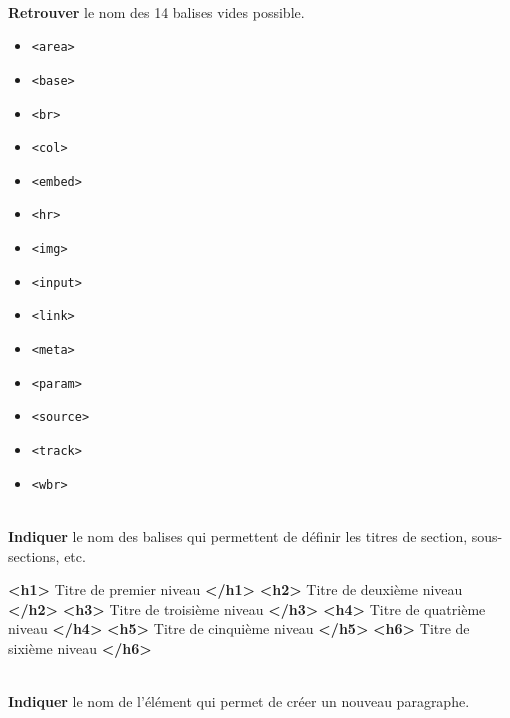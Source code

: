 \documentclass[a4paper,12pt]{article}
\newenvironment{eleve}%
{\begin{activite}\color{noiramu}\\}
{\end{activite}}
\providecommand{\tightlist}{%
      \setlength{\itemsep}{0pt}\setlength{\parskip}{0pt}}
\newenvironment{Shaded}{}{}
\newcommand{\KeywordTok}[1]{\textcolor[rgb]{0.00,0.44,0.13}{\textbf{{#1}}}}
\newcommand{\NormalTok}[1]{{#1}}
\begin{document}
\begin{eleve}
    \textbf{Retrouver} le nom des 14 balises vides possible.
        
        \end{eleve}\begin{methode}
    \begin{itemize}
\tightlist
\item
  \texttt{\textless{}area\textgreater{}}
\item
  \texttt{\textless{}base\textgreater{}}
\item
  \texttt{\textless{}br\textgreater{}}
\item
  \texttt{\textless{}col\textgreater{}}
\item
  \texttt{\textless{}embed\textgreater{}}
\item
  \texttt{\textless{}hr\textgreater{}}
\item
  \texttt{\textless{}img\textgreater{}}
\item
  \texttt{\textless{}input\textgreater{}}
\item
  \texttt{\textless{}link\textgreater{}}
\item
  \texttt{\textless{}meta\textgreater{}}
\item
  \texttt{\textless{}param\textgreater{}}
\item
  \texttt{\textless{}source\textgreater{}}
\item
  \texttt{\textless{}track\textgreater{}}
\item
  \texttt{\textless{}wbr\textgreater{}}
\end{itemize}

        \end{methode}\begin{eleve}
    \textbf{Indiquer} le nom des balises qui permettent de définir les
titres de section, sous-sections, etc.
        
        \end{eleve}\begin{methode}
    \begin{Shaded}
\begin{Highlighting}[]
\KeywordTok{<h1>}\NormalTok{ Titre de premier niveau }\KeywordTok{</h1>}
\KeywordTok{<h2>}\NormalTok{ Titre de deuxième niveau }\KeywordTok{</h2>}
\KeywordTok{<h3>}\NormalTok{ Titre de troisième niveau }\KeywordTok{</h3>}
\KeywordTok{<h4>}\NormalTok{ Titre de quatrième niveau }\KeywordTok{</h4>}
\KeywordTok{<h5>}\NormalTok{ Titre de cinquième niveau }\KeywordTok{</h5>}
\KeywordTok{<h6>}\NormalTok{ Titre de sixième niveau }\KeywordTok{</h6>}
\end{Highlighting}
\end{Shaded}

        \end{methode}\begin{eleve}
    \textbf{Indiquer} le nom de l'élément qui permet de créer un nouveau
paragraphe.
        
        \end{eleve}
\end{document}
